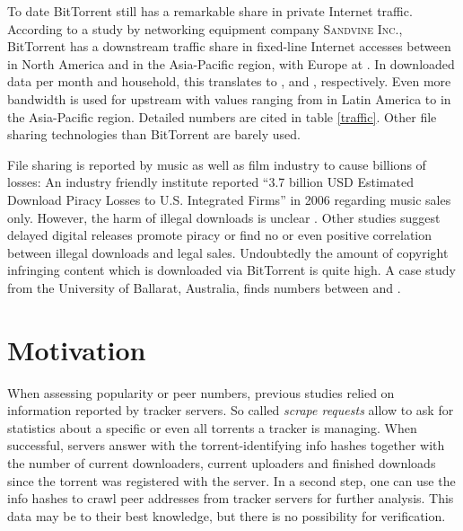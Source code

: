 \documentclass[10pt, a4paper, twoside, headsepline]{scrbook}
\renewcommand{\_}{\origunderscore\allowbreak}
\begin{document}
To date BitTorrent still has a remarkable share in private Internet traffic. According to a study \cite{sandvine2014} by networking equipment company \textsc{Sandvine Inc.}, BitTorrent has a downstream traffic share in fixed-line Internet accesses between  in North America and  in the Asia-Pacific region, with Europe at . In downloaded data per month and household, this translates to ,  and , respectively. Even more bandwidth is used for upstream with values ranging from  in Latin America to  in the Asia-Pacific region. Detailed numbers are cited in table \ref{traffic}. Other file sharing technologies than BitTorrent are barely used.

File sharing is reported by music as well as film industry to cause billions of losses: An industry friendly institute reported ``3.7 billion USD Estimated Download Piracy Losses to U.S. Integrated Firms'' \cite[table~1]{siwek2007true} in 2006 regarding music sales only. However, the harm of illegal downloads is unclear \cite{hammond2014profit}. Other studies suggest delayed digital releases promote piracy \cite{danaher2012reel} or find no \cite{mckenzie2009illegal} or even positive \cite{smith2010piracy} correlation between illegal downloads and legal sales. Undoubtedly the amount of copyright infringing content which is downloaded via BitTorrent is quite high. A case study \cite{watters2011much} from the University of Ballarat, Australia, finds numbers between  and .

\section{Motivation}
When assessing popularity or peer numbers, previous studies relied on information reported by tracker servers. So called \emph{scrape requests} allow to ask for statistics about a specific or even all torrents a tracker is managing. When successful, servers answer with the torrent-identifying info hashes together with the number of current downloaders, current uploaders and finished downloads since the torrent was registered with the server. In a second step, one can use the info hashes to crawl peer addresses from tracker servers for further analysis. This data may be to their best knowledge, but there is no possibility for verification.
\end{document}
